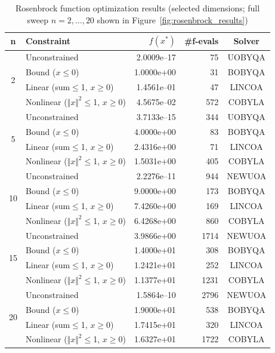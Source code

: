 \documentclass[11pt,a4paper]{article}
\begin{document}
\begin{table}[H]
\centering
\caption{Rosenbrock function optimization results (selected dimensions; full sweep $n=2,\ldots,20$ shown in Figure~\ref{fig:rosenbrock_results})}
\label{tab:rosenbrock}
\begin{tabular}{c l r r c}
\toprule
\textbf{n} & \textbf{Constraint} & \textbf{$f(x^*)$} & \textbf{\#f-evals} & \textbf{Solver} \\
\midrule
\multirow{4}{*}{2}
    & Unconstrained    & 2.0009e--17 & 75   & UOBYQA \\
    & Bound ($x \le 0$) & 1.0000e+00 & 31   & BOBYQA \\
    & Linear (sum$\le$1, $x\ge$0) & 1.4561e--01 & 47   & LINCOA \\
    & Nonlinear ($\Vert x\Vert^2\!\le$1, $x\ge$0) & 4.5675e--02 & 572  & COBYLA \\
\midrule
\multirow{4}{*}{5}
    & Unconstrained    & 3.7133e--15 & 344  & UOBYQA \\
    & Bound ($x \le 0$) & 4.0000e+00 & 83   & BOBYQA \\
    & Linear (sum$\le$1, $x\ge$0) & 2.4316e+00 & 71   & LINCOA \\
    & Nonlinear ($\Vert x\Vert^2\!\le$1, $x\ge$0) & 1.5031e+00 & 405  & COBYLA \\
\midrule
\multirow{4}{*}{10}
    & Unconstrained    & 2.2276e--11 & 944  & NEWUOA \\
    & Bound ($x \le 0$) & 9.0000e+00 & 173  & BOBYQA \\
    & Linear (sum$\le$1, $x\ge$0) & 7.4260e+00 & 169  & LINCOA \\
    & Nonlinear ($\Vert x\Vert^2\!\le$1, $x\ge$0) & 6.4268e+00 & 860  & COBYLA \\
\midrule
\multirow{4}{*}{15}
    & Unconstrained    & 3.9866e+00  & 1714 & NEWUOA \\
    & Bound ($x \le 0$) & 1.4000e+01 & 308  & BOBYQA \\
    & Linear (sum$\le$1, $x\ge$0) & 1.2421e+01 & 252  & LINCOA \\
    & Nonlinear ($\Vert x\Vert^2\!\le$1, $x\ge$0) & 1.1377e+01 & 1231 & COBYLA \\
\midrule
\multirow{4}{*}{20}
    & Unconstrained    & 1.5864e--10 & 2796 & NEWUOA \\
    & Bound ($x \le 0$) & 1.9000e+01 & 538  & BOBYQA \\
    & Linear (sum$\le$1, $x\ge$0) & 1.7415e+01 & 320  & LINCOA \\
    & Nonlinear ($\Vert x\Vert^2\!\le$1, $x\ge$0) & 1.6327e+01 & 1722 & COBYLA \\
\bottomrule
\end{tabular}
\end{table}
\end{document}
